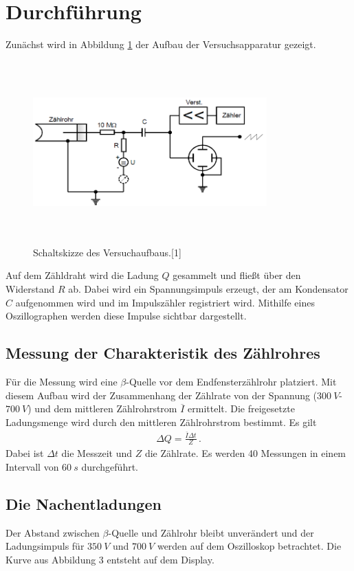 \section{Durchführung}
Zunächst wird in Abbildung \ref{fig:Messaparatur1} der Aufbau der Versuchsapparatur gezeigt.
\begin{figure}[h]
\begin{center}
\includegraphics[width = 9cm, height= 7cm]{Messapparatur.png}
\caption{Schaltskizze des Versuchaufbaus.[1]}
\label{fig:Messaparatur1}
\end{center}
\end{figure}
\newpage
\noindent
Auf dem Zähldraht wird die Ladung $Q$ gesammelt und fließt über den Widerstand $R$ ab.
Dabei wird ein Spannungsimpuls erzeugt, der am Kondensator $C$ aufgenommen wird und im Impulszähler registriert wird.
Mithilfe eines Oszillographen werden diese Impulse sichtbar dargestellt.

\subsection{Messung der Charakteristik des Zählrohres}
Für die Messung wird eine $\beta$-Quelle vor dem Endfensterzählrohr platziert.
Mit diesem Aufbau wird der Zusammenhang der Zählrate von der Spannung ($\SI{300}{V}$-$\SI{700}{V}$) und dem mittleren Zählrohrstrom $\overline{I}$ ermittelt.
Die freigesetzte Ladungsmenge wird durch den mittleren Zählrohrstrom bestimmt. Es gilt
\begin{align}
\Delta {Q} = \frac{\overline{{I}}\Delta {t}}{{Z}} \,.
\end{align}
Dabei ist $\Delta t$ die Messzeit und $Z$ die Zählrate.
  Es werden 40 Messungen in einem Intervall von $\SI{60}{s}$ durchgeführt.
\subsection{Die Nachentladungen}
Der Abstand zwischen $\beta$-Quelle und Zählrohr bleibt unverändert und der Ladungsimpuls für $\SI{350}{V}$ und $\SI{700}{V}$ werden auf dem Oszilloskop betrachtet.
Die Kurve aus Abbildung 3 entsteht auf dem Display.
\label{ssec:Nachentladung}
